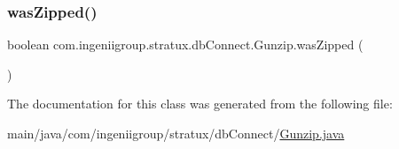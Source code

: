 \subsubsection{\texorpdfstring{was\+Zipped()}{wasZipped()}}
{\footnotesize\ttfamily boolean com.\+ingeniigroup.\+stratux.\+db\+Connect.\+Gunzip.\+was\+Zipped (\begin{DoxyParamCaption}{ }\end{DoxyParamCaption})}



The documentation for this class was generated from the following file\+:\begin{DoxyCompactItemize}
\item 
main/java/com/ingeniigroup/stratux/db\+Connect/\hyperlink{_gunzip_8java}{Gunzip.\+java}\end{DoxyCompactItemize}
